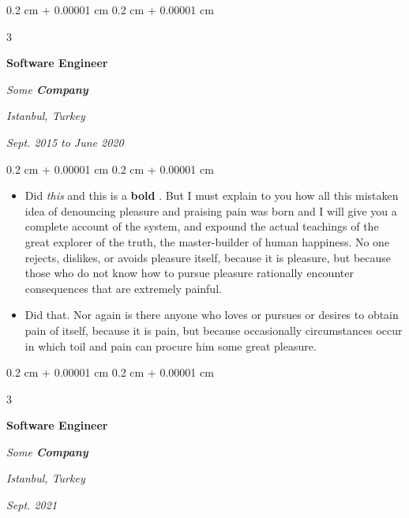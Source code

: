 \documentclass[10pt, letterpaper]{article}
\newenvironment{highlights}{
    \begin{itemize}[
        topsep=0.10 cm,
        parsep=0.10 cm,
        partopsep=0pt,
        itemsep=0pt,
        leftmargin=0.4 cm + 10pt + 0.6 cm
    ]
}{
    \end{itemize}
} %
\newenvironment{onecolentry}{
    \begin{adjustwidth}{
        0.2 cm + 0.00001 cm
    }{
        0.2 cm + 0.00001 cm
    }
}{
    \end{adjustwidth}
} %
\newenvironment{threecolentry}[3][]{
    \onecolentry
    \def\thirdColumn{#3}
    \setcolumnwidth{0.6 cm, \fill, 4.5 cm}
    \begin{paracol}{3}
    #2 \switchcolumn
}{
    \switchcolumn \raggedleft \thirdColumn
    \end{paracol}
    \endonecolentry
} %
\let\hrefWithoutArrow\href
\renewcommand{\href}[2]{\hrefWithoutArrow{#1}{\mbox{\ifthenelse{\equal{#2}{}}{ }{#2 }\raisebox{.15ex}{\footnotesize \faExternalLink*}}}}
\begin{document}
        \vspace{0.2 cm-3px}

        \begin{threecolentry}{
            \vspace*{\fill}
            \textbullet
            \vspace*{3px}
            \vspace*{\fill}
        }{
        \textit{Istanbul, Turkey}    
            
        \textit{Sept. 2015 to June 2020}}
            \textbf{Software Engineer}
            
            \textit{Some \textbf{Company}}
        \end{threecolentry}

        \vspace{0.10 cm-3px}
        \begin{onecolentry}
            \begin{highlights}
                \item Did \textit{this} and this is a \textbf{bold} \href{https://example.com}{link}. But I must explain to you how all this mistaken idea of denouncing pleasure and praising pain was born and I will give you a complete account of the system, and expound the actual teachings of the great explorer of the truth, the master-builder of human happiness. No one rejects, dislikes, or avoids pleasure itself, because it is pleasure, but because those who do not know how to pursue pleasure rationally encounter consequences that are extremely painful.
                \item Did that. Nor again is there anyone who loves or pursues or desires to obtain pain of itself, because it is pain, but because occasionally circumstances occur in which toil and pain can procure him some great pleasure.
            \end{highlights}
        \end{onecolentry}


        \vspace{0.2 cm-3px}

        \begin{threecolentry}{
            \vspace*{\fill}
            \textbullet
            \vspace*{3px}
            \vspace*{\fill}
        }{
        \textit{Istanbul, Turkey}    
            
        \textit{Sept. 2021}}
            \textbf{Software Engineer}
            
            \textit{Some \textbf{Company}}
        \end{threecolentry}
\end{document}
